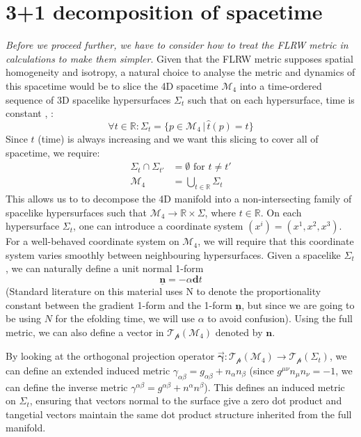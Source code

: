 \documentclass[aps,prd,reprint,preprintnumbers,showpacs,floatfix,nofootinbib,superscript address]{revtex4-2}
\begin{document}
\section{3+1 decomposition of spacetime} \label{3+1 decomposition of spacetime}
\textit{Before we proceed further, we have to consider how to treat the FLRW metric in calculations to make them simpler}. Given that the FLRW metric supposes spatial homogeneity and isotropy, a natural choice to analyse the metric and dynamics of this spacetime would be to slice the 4D spacetime $\mathcal{M}_4$ into a time-ordered sequence of 3D spacelike hypersurfaces $\Sigma_t$ such that on each hypersurface, time is constant \cite{baumann2012tasilecturesinflation}, 
\cite{gourgoulhon_31_2007}:
\begin{equation}
    \forall t \in \mathbb{R} : \Sigma_t = \{p \in \mathcal{M}_4 \, | \, \hat{t} (p) = t\} \nonumber
\end{equation}
Since $t$ (time) is always increasing and we want this slicing to cover all of spacetime, we require:
\begin{align}
    \Sigma_t \cap \Sigma_{t'} &= \emptyset \,\, \text{for}\,\, t \neq t' \nonumber \\
    \mathcal{M}_4 &= \bigcup_{t \in \mathbb{R}} \Sigma_t \nonumber
\end{align}
This allows us to to decompose the 4D manifold into a non-intersecting family of spacelike hypersurfaces such that $\mathcal{M}_4 \rightarrow \mathbb{R} \times \Sigma$, where $t \in \mathbb{R}$. On each hypersurface $\Sigma_t$, one can introduce a coordinate system $(x^i) = (x^1,x^2,x^3)$. For a well-behaved coordinate system on $\mathcal{M}_4$, we will require that this coordinate system varies smoothly between neighbouring hypersurfaces. Given a spacelike $\Sigma_t$, we can naturally define a unit normal 1-form 
\begin{equation} \label{unit 1-form}
    \underline{\bm{n}} = - \alpha \textbf{d}t    
\end{equation}
(Standard literature on this material uses N to denote the proportionality constant between the gradient 1-form and the 1-form $\underline{\bm{n}}$, but since we are going to be using $N$ for the efolding time, we will use $\alpha$ to avoid confusion). Using the full metric, we can also define a vector in $\mathcal{T_p}(\mathcal{M}_4)$ denoted by $\bm{n}$.

By looking at the orthogonal projection operator $\Vec{\mathbf{\gamma}} : \mathcal{T_p}(\mathcal{M}_4) \rightarrow \mathcal{T_p}(\Sigma_t)$, we can define an extended induced metric $\gamma_{\alpha\beta} = g_{\alpha\beta} + n_\alpha n_\beta$ (since $g^{\mu\nu} n_\mu n_\nu = -1$, we can define the inverse metric $\gamma^{\alpha\beta} = g^{\alpha\beta} + n^\alpha n^\beta$). This defines an induced metric on $\Sigma_t$, ensuring that vectors normal to the surface give a zero dot product and tangetial vectors maintain the same dot product structure inherited from the full manifold. 
\end{document}
